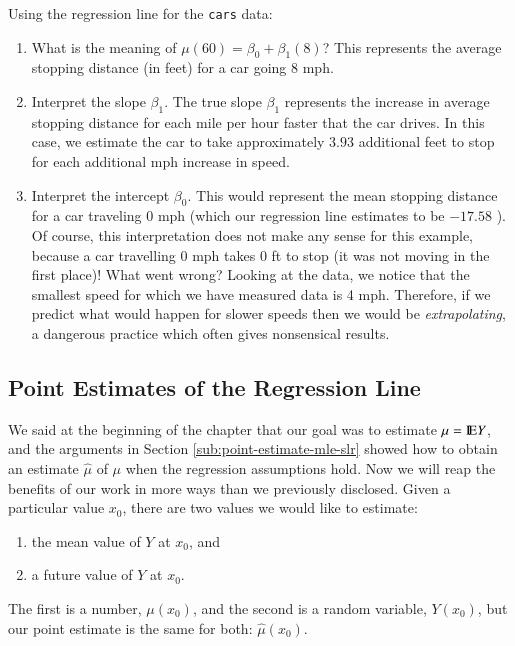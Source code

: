 \documentclass[captions=tableheading]{scrbook}
\begin{document}
\begin{example}
\label{exa:regline-cars-interpret}

Using the regression line for the \texttt{cars} data:

\begin{enumerate}
\item What is the meaning of \( \mu(60) = \beta_{0} + \beta_{1}(8) \)? 
   This represents the average stopping distance (in feet) for a car going 8 mph.
\item Interpret the slope \(\beta_{1}\). 
   The true slope \(\beta_{1}\) represents the increase in average stopping distance for each mile per hour faster that the car drives. In this case, we estimate the car to take approximately \(  3.93 \) additional feet to stop for each additional mph increase in speed.
\item Interpret the intercept \( \beta_{0} \).
   This would represent the mean stopping distance for a car traveling 0 mph (which our regression line estimates to be \(  -17.58 \) ). Of course, this interpretation does not make any sense for this example, because a car travelling 0 mph takes 0 ft to stop (it was not moving in the first place)! What went wrong? Looking at the data, we notice that the smallest speed for which we have measured data is 4 mph. Therefore, if we predict what would happen for slower speeds then we would be \emph{extrapolating}, a dangerous practice which often gives nonsensical results.
\end{enumerate}
\end{example}
\subsection{Point Estimates of the Regression Line}
\label{sec-11-2-2}

\label{sub:slr-point-est-regline}

We said at the beginning of the chapter that our goal was to estimate \( \mu = \mathrm{I\hspace{-1.5pt}E} Y \), and the arguments in Section \ref{sub:point-estimate-mle-slr} showed how to obtain an estimate \( \hat{\mu} \) of \( \mu \) when the regression assumptions hold. Now we will reap the benefits of our work in more ways than we previously disclosed. Given a particular value \(x_{0}\), there are two values we would like to estimate:
\begin{enumerate}
\item the mean value of \(Y\) at \(x_{0}\), and
\item a future value of \(Y\) at \(x_{0}\).
\end{enumerate}
The first is a number, \(\mu(x_{0})\), and the second is a random variable, \(Y(x_{0})\), but our point estimate is the same for both: \(\hat{\mu}(x_{0})\).
\end{document}

